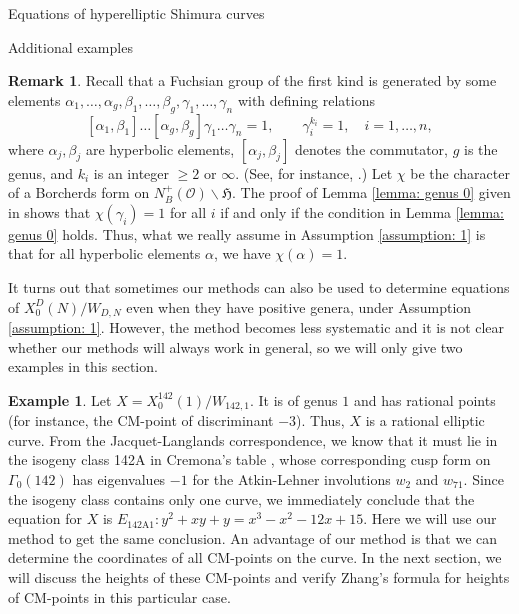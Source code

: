 \documentclass{amsart}
\newcounter{lemma}
\theoremstyle{definition}
\newtheorem{Example}[lemma]{Example}
\newtheorem{Remark}[lemma]{Remark}
\def\H{\mathfrak H}
\def\O{\mathcal O}
\begin{document}
\begin{section}{Equations of hyperelliptic Shimura curves}
\begin{subsection}{Additional examples}
\begin{Remark} Recall that a Fuchsian group of the first kind is
  generated by some elements
  $\alpha_1,\ldots,\alpha_g,\beta_1,\ldots,\beta_g,\gamma_1,\ldots,\gamma_n$
  with defining relations
  $$
    [\alpha_1,\beta_1]\ldots[\alpha_g,\beta_g]\gamma_1\ldots\gamma_n=1,
    \qquad \gamma_i^{k_i}=1, \quad i=1,\ldots,n,
  $$
  where $\alpha_j,\beta_j$ are hyperbolic elements,
  $[\alpha_j,\beta_j]$ denotes the commutator, $g$ is the genus, and
  $k_i$ is an integer $\ge 2$ or $\infty$. (See, for instance,
  \cite{Katok}.) Let $\chi$ be the character of a Borcherds form on
  $N_B^+(\O)\backslash\H$. The proof of Lemma \ref{lemma: genus 0}
  given in \cite{Yang-CM} shows that $\chi(\gamma_i)=1$ for all $i$ 
  if and only if the condition in Lemma \ref{lemma: genus 0} holds.
  Thus, what we really assume in Assumption \ref{assumption: 1} is
  that for all hyperbolic elements $\alpha$, we have $\chi(\alpha)=1$.
\end{Remark}

It turns out that sometimes our methods can also be used to determine
equations of $X_0^D(N)/W_{D,N}$ even when they have positive
genera, under Assumption \ref{assumption: 1}. However, the method
becomes less  systematic and it is not clear whether our methods will
always work in general, so we will only give two examples in this section.

\begin{Example} \label{example: 142}
Let $X=X_0^{142}(1)/W_{142,1}$. It is of genus $1$ and has
rational points (for instance, the CM-point of discriminant $-3$).
Thus, $X$ is a rational elliptic curve. From the Jacquet-Langlands
correspondence, we know that it must lie in the isogeny class 142A in
Cremona's table \cite{Cremona}, whose corresponding cusp form on
$\Gamma_0(142)$ has eigenvalues $-1$ for the Atkin-Lehner involutions
$w_2$ and $w_{71}$. Since the isogeny class contains only 
one curve, we immediately conclude that the equation for
$X$ is $E_{\text{142A1}}:y^2+xy+y=x^3-x^2-12x+15$. Here we
will use our method to get the same conclusion. An advantage of our
method is that we can determine the coordinates of all CM-points on
the curve. In the next section, we will discuss the heights of these
CM-points and verify Zhang's formula \cite{Zhang} for heights of
CM-points in this particular case.


\end{Example}
\end{subsection}
\end{section}
\end{document}

